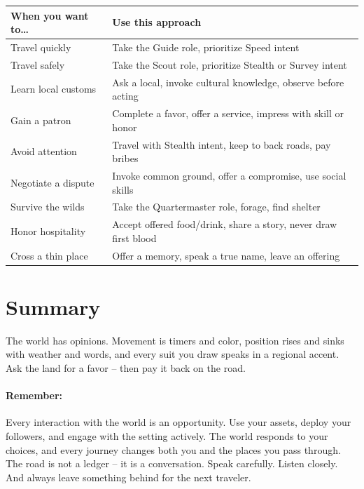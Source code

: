 \begin{center}
\begin{longtable}{ll}
\toprule
\textbf{When you want to\dots} & \textbf{Use this approach} \\
\midrule
Travel quickly & Take the Guide role, prioritize Speed intent \\
Travel safely & Take the Scout role, prioritize Stealth or Survey intent \\
Learn local customs & Ask a local, invoke cultural knowledge, observe before acting \\
Gain a patron & Complete a favor, offer a service, impress with skill or honor \\
Avoid attention & Travel with Stealth intent, keep to back roads, pay bribes \\
Negotiate a dispute & Invoke common ground, offer a compromise, use social skills \\
Survive the wilds & Take the Quartermaster role, forage, find shelter \\
Honor hospitality & Accept offered food/drink, share a story, never draw first blood \\
Cross a thin place & Offer a memory, speak a true name, leave an offering \\
\bottomrule
\end{longtable}
\end{center}

\section{Summary}
\label{sec:world-summary}
The world has opinions. Movement is timers and color, position rises and sinks with weather and words, and every suit you draw speaks in a regional accent. Ask the land for a favor -- then pay it back on the road.

\paragraph{Remember:} Every interaction with the world is an opportunity. Use your assets, deploy your followers, and engage with the setting actively. The world responds to your choices, and every journey changes both you and the places you pass through. The road is not a ledger -- it is a conversation. Speak carefully. Listen closely. And always leave something behind for the next traveler.
